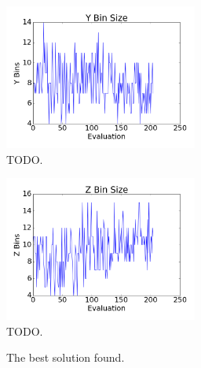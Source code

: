 \documentclass[conference]{IEEEtran}
\begin{document}
\begin{figure}[!t]
\centering
\includegraphics[width=2.5in]{ybinsize}
\caption{TODO.}
\label{fig:ybinsize}
\end{figure}

\begin{figure}[!t]
\centering
\includegraphics[width=2.5in]{zbinsize}
\caption{TODO.}
\label{fig:zbinsize}
\end{figure}

\begin{figure}[!t]
\centering
{}
\hfil
{}
\caption{The best solution found.}
\label{fig:optimal}
\end{figure}
\end{document}
